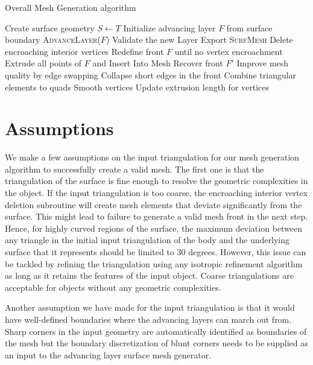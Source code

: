 \begin{algorithm}[hbt!]
	\caption{Overall Mesh Generation algorithm}\label{alg:euclid}
	\begin{algorithmic}[1]
		\State Create surface geometry $S \gets T$
		\State Initialize advancing layer $F$ from surface boundary
		\State \textsc{AdvanceLayer($F$)}
		\State Validate the new Layer
		\EndWhile \label{advancing-layer-routine}
		\State Export \textsc{SurfMesh}
		\EndProcedure
		\State Delete encroaching interior vertices
		\State Redefine front $F$ until no vertex encroachment 
		\State Extrude all points of $F$ and Insert Into Mesh
		\State Recover front $F'$ 
		\State Improve mesh quality by edge swapping 
		\State Collapse short edges in the front
		\State Combine triangular elements to quads
		\State Smooth vertices
		\State Update extrusion length for vertices
		\EndProcedure
	\end{algorithmic}
	\label{algo}
\end{algorithm}

\section{Assumptions}

We make a few assumptions on the input triangulation for our mesh generation algorithm to successfully create a valid mesh. The first one is that the triangulation of the surface is fine enough to resolve the geometric complexities in the object. If the input triangulation is too coarse, the encroaching interior vertex deletion subroutine will create mesh elements that deviate significantly from the surface. This might lead to failure to generate a valid mesh front in the next step. Hence, for highly curved regions of the surface, the maximum deviation between any triangle in the initial input triangulation of the body and the underlying surface that it represents should be limited to 30 degrees. However, this issue can be tackled by refining the triangulation using any isotropic refinement algorithm as long as it retains the features of the input object. Coarse triangulations are acceptable for objects without any geometric complexities.

Another assumption we have made for the input triangulation is that it would have well-defined boundaries where the advancing layers can march out from. Sharp corners in the input geometry are automatically identified as boundaries of the mesh but the boundary discretization of blunt corners needs to be supplied as an input to the advancing layer surface mesh generator.